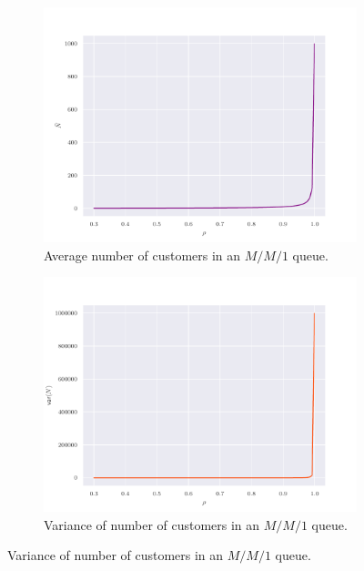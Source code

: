 \documentclass[11pt, a4paper]{report}
\begin{document}
\begin{figure}
    \begin{subfigure}[b]{0.55\textwidth}
        \centering
        \includegraphics[width=\textwidth]{plots/avg_mm1.pdf}
        \caption{Average number of customers in an $M/M/1$ queue.}
        \label{fig:avgMM1_plot}
    \end{subfigure}
    \hfill
    \begin{subfigure}[b]{0.55\textwidth}
        \centering
        \includegraphics[width=\textwidth]{plots/var_mm1.pdf}
        \caption{Variance of number of customers in an $M/M/1$ queue.}
        \label{fig:varMM1_plot}
    \end{subfigure}
    \label{fig:mm1_stats}
\end{figure}
\end{document}

